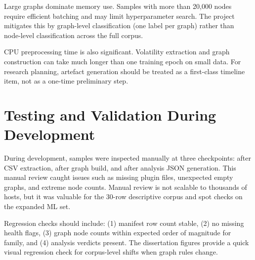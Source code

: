 Large graphs dominate memory use. Samples with more than 20,000 nodes require efficient batching and may limit hyperparameter search. The project mitigates this by graph-level classification (one label per graph) rather than node-level classification across the full corpus.

CPU preprocessing time is also significant. Volatility extraction and graph construction can take much longer than one training epoch on small data. For research planning, artefact generation should be treated as a first-class timeline item, not as a one-time preliminary step.

\section{Testing and Validation During Development}

During development, samples were inspected manually at three checkpoints: after CSV extraction, after graph build, and after analysis JSON generation. This manual review caught issues such as missing plugin files, unexpected empty graphs, and extreme node counts. Manual review is not scalable to thousands of hosts, but it was valuable for the 30-row descriptive corpus and spot checks on the expanded ML set.

Regression checks should include: (1) manifest row count stable, (2) no missing health flags, (3) graph node counts within expected order of magnitude for family, and (4) analysis verdicts present. The dissertation figures provide a quick visual regression check for corpus-level shifts when graph rules change.
